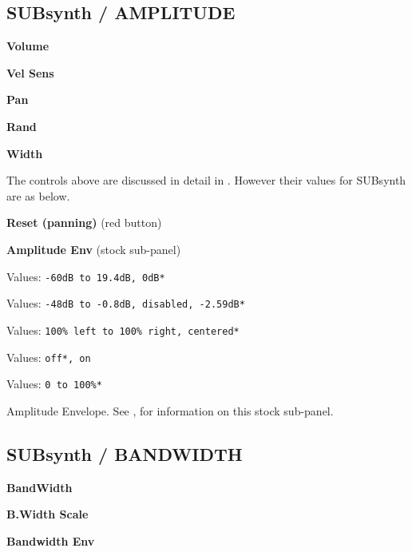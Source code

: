\subsection{SUBsynth / AMPLITUDE}
\label{subsec:subsynth_amplitude}

   \begin{enumber}
      \item \textbf{Volume}
      \item \textbf{Vel Sens}
      \item \textbf{Pan}
      \item \textbf{Rand}
      \item \textbf{Width}

       The controls above are discussed in detail in
       . However their values for SUBsynth
       are as below.
      \item \textbf{Reset (panning)} (red button)
      \item \textbf{Amplitude Env} (stock sub-panel)
   \end{enumber}

   \setcounter{ItemCounter}{0}      %


   Values: \texttt{-60dB to 19.4dB, 0dB*}


   Values: \texttt{-48dB to -0.8dB, disabled, -2.59dB*}


   Values: \texttt{100\% left to 100\% right, centered*}


   Values: \texttt{off*, on}


   Values: \texttt{0 to 100\%* }

   Amplitude Envelope.
   See ,
   for information on this stock sub-panel.

\subsection{SUBsynth / BANDWIDTH}
\label{subsec:subsynth_bandwidth}

   \begin{enumber}
      \item \textbf{BandWidth}
      \item \textbf{B.Width Scale}
      \item \textbf{Bandwidth Env}
   \end{enumber}

